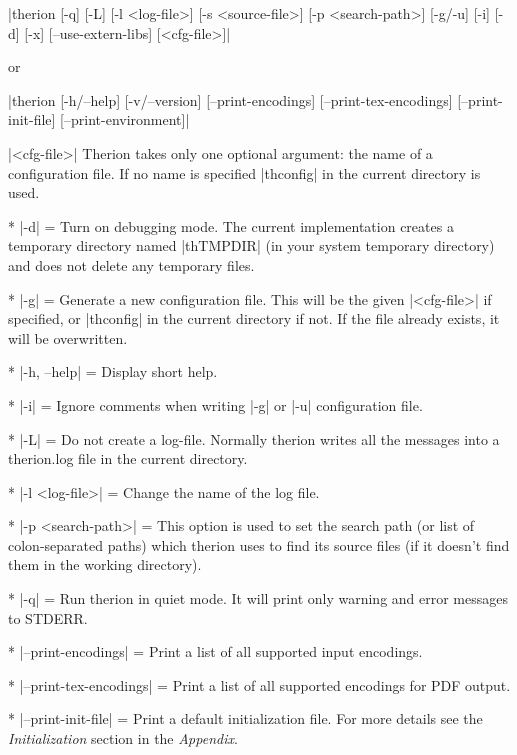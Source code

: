 |therion [-q] [-L] [-l <log-file>]
        [-s <source-file>] [-p <search-path>]
        [-g/-u] [-i] [-d] [-x] [--use-extern-libs] [<cfg-file>]|

or

|therion [-h/--help]
        [-v/--version]
        [--print-encodings]
        [--print-tex-encodings]
        [--print-init-file]
        [--print-environment]|

\arguments
  |<cfg-file>| 
  Therion takes only one optional argument: the name of a configuration
  file. If no name is specified |thconfig| in the current directory is used. 
\endarguments

\options
* |-d| =
  Turn on debugging mode. The current implementation creates a 
  temporary directory named |thTMPDIR| (in your system temporary 
  directory) and does not delete any temporary files. 

* |-g| =
  Generate a new configuration file. This will be the given 
  |<cfg-file>| if specified, or |thconfig| in the current directory if not. 
  If the file already exists, it will be overwritten.
        
* |-h, --help| =
        Display short help.

* |-i| =
        Ignore comments when writing |-g| or |-u| configuration file.

* |-L| =
        Do not create a log-file. Normally therion writes all the messages
        into a therion.log file in the current directory.
        
* |-l <log-file>| =
        Change the name of the log file.
        
* |-p <search-path>| =
        This option is used to set the search path (or list of 
	colon-separated paths) which therion uses to find its source
        files (if it doesn't find them in the working directory).

* |-q| =
        Run therion in quiet mode. It will print only warning
        and error messages to STDERR.

* |--print-encodings| =
        Print a list of all supported input encodings.
        
* |--print-tex-encodings| =
        Print a list of all supported encodings for PDF output.
        
* |--print-init-file| =
        Print a default initialization file. For more details
        see the {\it Initialization} section in the {\it Appendix}.
        
